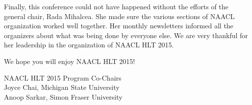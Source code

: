 Finally, this conference could not have happened without the efforts
of the general chair, Rada Mihalcea. She made sure the various
sections of NAACL organization worked well together. Her monthly
newsletters informed all the organizers about what was being done
by everyone else. We are very thankful for her leadership in the
organization of NAACL HLT 2015.

We hope you will enjoy NAACL HLT 2015!

\noindent NAACL HLT 2015 Program Co-Chairs \\
Joyce Chai, Michigan State University \\
Anoop Sarkar, Simon Fraser University
